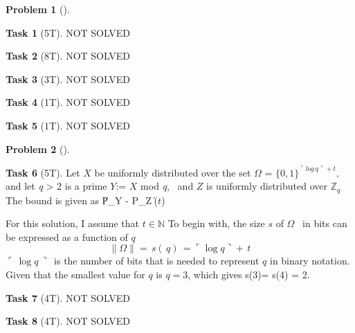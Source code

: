 \documentclass[11pt,twoside]{article}
\theoremstyle{definition}
\newtheorem{amsproblem}{Problem}
\newtheorem{amssubproblem}{Task}[amsproblem]
\newenvironment{problem}[1][]{%
  \begin{amsproblem}[#1]
  }{%
  \end{amsproblem}
}
\newenvironment{subproblem}[1][]{%
  \begin{amssubproblem}[#1]
  }{%
  \end{amssubproblem}
}
\newcommand{\TP}[1]{#1T}
\begin{document}
\noindent
\hrulefill

\begin{problem}
  \begin{subproblem}[\TP{5}]
    NOT SOLVED %
  \end{subproblem}
  \begin{subproblem}[\TP{8}]
    NOT SOLVED %
  \end{subproblem}
  \begin{subproblem}[\TP{3}]
    NOT SOLVED %
  \end{subproblem}
  \begin{subproblem}[\TP{1}]
    NOT SOLVED %
  \end{subproblem}
  \begin{subproblem}[\TP{1}]
    NOT SOLVED %
  \end{subproblem}
\end{problem}

\noindent
\hrulefill

\begin{problem}
  \begin{subproblem}[\TP{5}]
    \item Let $X$ be uniformly distributed over the set $\Omega$ = ${\{0,1\}}^{\ulcorner log \,q \urcorner + t},$ \,and let \textit{q} > 2 is a prime\newline 
    $Y$:= $X$ mod \textit{q}, \, and $Z$ is uniformly distributed over $\mathbb{Z}_{\textit{q}}$ \newline 
    The bound is given as \| P_Y - P_Z \| \leq \beta($t$) 

\item For this solution, I assume that $t \in \mathbb{N}$ \newline
To begin with, the size $s$ of $\Omega$ \, 
in bits can be expressed as a function of $q$ 
$$ \| \Omega \| = \, s(\,q)  \, = \ulcorner \log q \urcorner + \, t $$ \newline
$\ulcorner \, \log{q} \, \urcorner $\, is the number of bits that is needed to represent $q$ in binary notation. \\
Given that the smallest value for $q$ is $q=3$, which gives s(3)= s(4) = 2.
    
  \end{subproblem}
  \begin{subproblem}[\TP{4}]
    NOT SOLVED %
  \end{subproblem}
  \begin{subproblem}[\TP{4}]
    NOT SOLVED %
  \end{subproblem}
\end{problem}
\end{document}
